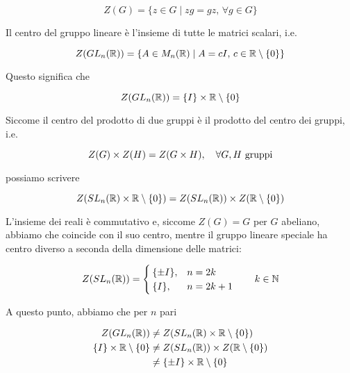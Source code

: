 \begin{equation}
	Z(G) = \{ z \in G \mid zg = gz, \, \forall g \in G \}
\end{equation}

Il centro del gruppo lineare è l'insieme di tutte le matrici scalari, i.e.

\begin{equation}
	Z(GL_{n}(\mathbb{R})) = \{ A \in M_{n}(\mathbb{R}) \mid A = c I, \, c \in \mathbb{R} \setminus \{0\} \}
\end{equation}

Questo significa che

\begin{equation}
	Z(GL_{n}(\mathbb{R})) = \{I\} \times \mathbb{R} \setminus \{0\}
\end{equation}

Siccome il centro del prodotto di due gruppi è il prodotto del centro dei gruppi, i.e.

\begin{equation}
	Z(G) \times Z(H) = Z(G \times H) \qcomma \forall G,H \text{ gruppi}
\end{equation}

possiamo scrivere

\begin{equation}
	Z(SL_{n}(\mathbb{R}) \times \mathbb{R} \setminus \{0\}) = Z(SL_{n}(\mathbb{R})) \times Z(\mathbb{R} \setminus \{0\})
\end{equation}

L'insieme dei reali è commutativo e, siccome $ Z(G) = G $ per $ G $ abeliano, abbiamo che coincide con il suo centro, mentre il gruppo lineare speciale ha centro diverso a seconda della dimensione delle matrici:

\begin{equation}
	Z(SL_{n}(\R)) = %
	\begin{cases}
		\{ \pm I \}, & n = 2 k \\
		\{ I \}, & n = 2 k + 1
	\end{cases} %
	\qquad k \in \N
\end{equation}

A questo punto, abbiamo che per $ n $ pari

\begin{align}
	\begin{split}
		Z(GL_{n}(\mathbb{R})) &\neq Z(SL_{n}(\mathbb{R}) \times \mathbb{R} \setminus \{0\}) \\
		\{ I \} \times \mathbb{R} \setminus \{0\} &\neq Z(SL_{n}(\mathbb{R})) \times Z(\mathbb{R} \setminus \{0\}) \\
		&\neq \{ \pm I \} \times \mathbb{R} \setminus \{0\}
	\end{split}
\end{align}

